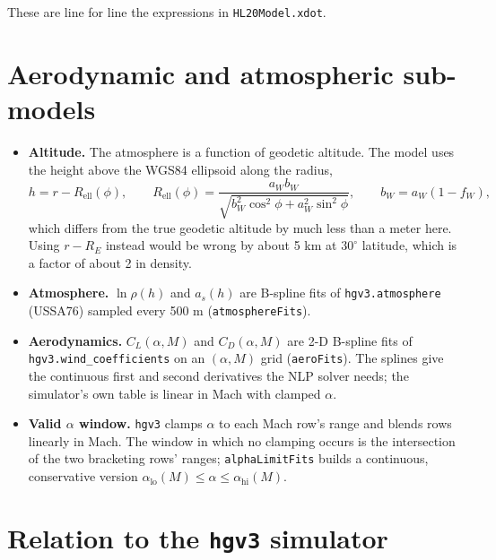 \documentclass[11pt]{report}
\numberwithin{equation}{chapter}
\newcommand{\code}[1]{\texttt{#1}}
\begin{document}
These are line for line the expressions in \code{HL20Model.xdot}.

\section{Aerodynamic and atmospheric sub-models}

\begin{itemize}
\item \textbf{Altitude.} The atmosphere is a function of geodetic altitude. The model uses
  the height above the WGS84 ellipsoid along the radius,
  \begin{equation}
    h = r - R_{\text{ell}}(\phi),\qquad
    R_{\text{ell}}(\phi) = \frac{a_W b_W}{\sqrt{b_W^2\cos^2\phi + a_W^2\sin^2\phi}},\qquad
    b_W = a_W(1-f_W),
  \end{equation}
  which differs from the true geodetic altitude by much less than a meter here. Using
  $r - R_E$ instead would be wrong by about 5 km at $30^\circ$ latitude, which is a
  factor of about 2 in density.
\item \textbf{Atmosphere.} $\ln\rho(h)$ and $a_s(h)$ are B-spline fits of
  \code{hgv3.atmosphere} (USSA76) sampled every 500 m (\code{atmosphereFits}).
\item \textbf{Aerodynamics.} $C_L(\alpha,M)$ and $C_D(\alpha,M)$ are 2-D B-spline fits of
  \code{hgv3.wind\_coefficients} on an $(\alpha,M)$ grid (\code{aeroFits}). The splines give
  the continuous first and second derivatives the NLP solver needs; the simulator's own
  table is linear in Mach with clamped $\alpha$.
\item \textbf{Valid $\alpha$ window.} \code{hgv3} clamps $\alpha$ to each Mach row's range
  and blends rows linearly in Mach. The window in which no clamping occurs is the
  intersection of the two bracketing rows' ranges; \code{alphaLimitFits} builds a
  continuous, conservative version $\alpha_{\text{lo}}(M)\le\alpha\le\alpha_{\text{hi}}(M)$.
\end{itemize}

\section{Relation to the \texttt{hgv3} simulator}
\end{document}
